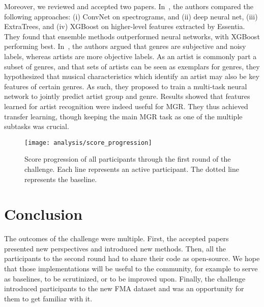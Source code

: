\documentclass[sigconf]{acmart}
\begin{document}
Moreover, we reviewed and accepted two papers.
%
In~\cite{gradient_boosting}, the authors compared the following approaches: (i) ConvNet on spectrograms, and (ii) deep neural net, (iii) ExtraTrees, and (iv) XGBoost on higher-level features extracted by Essentia. They found that ensemble methods outperformed neural networks, with XGBoost performing best.
%
In~\cite{transfer_learning}, the authors argued that genres are subjective and noisy labels, whereas artists are more objective labels.
As an artist is commonly part a subset of genres, and that sets of artists can be seen as exemplars for genres, they hypothesized that musical characteristics which identify an artist may also be key features of certain genres.
As such, they proposed to train a multi-task neural network to jointly predict artist group and genre. Results showed that features learned for artist recognition were indeed useful for MGR.
They thus achieved transfer learning, though keeping the main MGR task as one of the multiple subtasks was crucial.


\begin{figure}[t]
\centering
\texttt{[image: analysis/score\_progression]}
\caption{Score progression of all participants through the first round of the challenge. Each line represents an active participant.
The dotted line represents the baseline.}
\label{fig:timeline}
\end{figure}

\section{Conclusion}

The outcomes of the challenge were multiple. First, the accepted papers presented new perspectives and introduced new methods. Then, all the participants to the second round had to share their code as open-source. We hope that those implementations will be useful to the community, for example to serve as baselines, to be scrutinized, or to be improved upon. Finally, the challenge introduced participants to the new FMA dataset and was an opportunity for them to get familiar with it.
\end{document}
